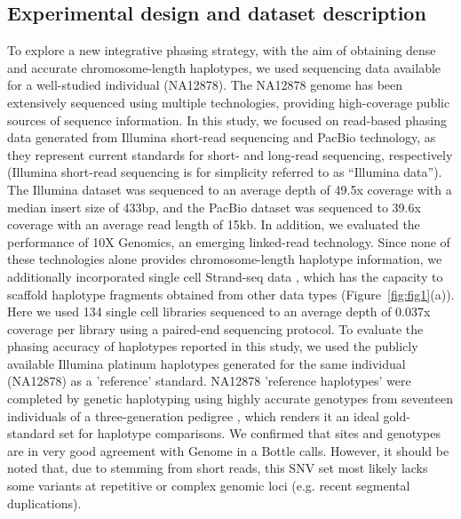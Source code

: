 \subsection{Experimental design and dataset description}
	To explore a new integrative phasing strategy, with the aim of obtaining dense and accurate chromosome-length haplotypes, we used sequencing data available for a well-studied individual (NA12878). 
	The NA12878 genome has been extensively sequenced using multiple technologies, providing high-coverage public sources of sequence information.	
	In this study, we focused on read-based phasing data generated from Illumina short-read sequencing and PacBio technology, as they represent current standards for short- and long-read sequencing, 
	respectively (Illumina short-read sequencing is for simplicity referred to as “Illumina data”). 
	The Illumina dataset was sequenced to an average depth of 49.5x coverage with a median insert size of 433bp, and the PacBio dataset was sequenced to 39.6x coverage with an average read length of 15kb.
	In addition, we evaluated the performance of 10X Genomics, an emerging linked-read technology. Since none of these technologies alone provides chromosome-length haplotype information, 
	we additionally incorporated single cell Strand-seq data \citep{Porubsky2016}, which has the capacity to scaffold haplotype fragments obtained from other data types (Figure~\ref{fig:fig1}(a)). 
	Here we used 134 single cell libraries sequenced to an average depth of 0.037x coverage per library using a paired-end sequencing protocol. 
	To evaluate the phasing accuracy of haplotypes reported in this study, we used the publicly available Illumina platinum haplotypes generated for the same individual (NA12878) as a 'reference' standard.
	NA12878 'reference haplotypes’ were completed by genetic haplotyping using highly accurate genotypes from seventeen individuals of a three-generation pedigree \citep{eberle2017reference}, which renders it an ideal gold-standard set for haplotype comparisons. 
	We confirmed that sites and genotypes are in very good agreement with Genome in a Bottle calls.
	However, it should be noted that, due to stemming from short reads, this SNV set most likely lacks some variants at repetitive or complex genomic loci (e.g. recent segmental duplications).

